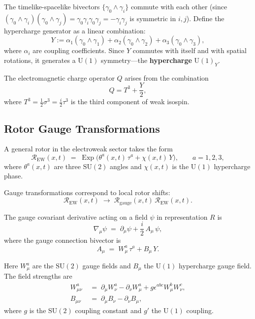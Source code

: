 \documentclass[11pt,a4paper]{article}
\newcommand{\Exp}{\operatorname{Exp}}
\newcommand{\Rotor}{\mathcal{R}}
\newcommand{\D}{\nabla}                        %
\newcommand{\SU}{\mathrm{SU}}
\newcommand{\U}{\mathrm{U}}
\theoremstyle{definition}
\theoremstyle{plain}
\theoremstyle{remark}
\begin{document}
The timelike-spacelike bivectors $\{\gamma_0\wedge\gamma_i\}$ commute with each other (since $(\gamma_0\wedge\gamma_i)(\gamma_0\wedge\gamma_j) = \gamma_0\gamma_i\gamma_0\gamma_j = -\gamma_i\gamma_j$ is symmetric in $i,j$). Define the hypercharge generator as a linear combination:
\begin{equation}
  Y := \alpha_1(\gamma_0\wedge\gamma_1) + \alpha_2(\gamma_0\wedge\gamma_2) + \alpha_3(\gamma_0\wedge\gamma_3),
  \label{eq:hypercharge}
\end{equation}
where $\alpha_i$ are coupling coefficients. Since $Y$ commutes with itself and with spatial rotations, it generates a $\U(1)$ symmetry---the \textbf{hypercharge} $\U(1)_Y$.

The electromagnetic charge operator $Q$ arises from the combination
\begin{equation}
  Q = T^3 + \frac{Y}{2},
\end{equation}
where $T^3 = \frac{1}{2}\sigma^3 = \frac{i}{2}\tau^3$ is the third component of weak isospin.

\subsection{Rotor Gauge Transformations}

A general rotor in the electroweak sector takes the form
\begin{equation}
  \Rotor_{\text{EW}}(x,t) \;=\; \Exp\!\big(\theta^a(x,t)\,\tau^a + \chi(x,t)\,Y\big),
  \qquad a=1,2,3,
  \label{eq:rotor-ew}
\end{equation}
where $\theta^a(x,t)$ are three $\SU(2)$ angles and $\chi(x,t)$ is the $\U(1)$ hypercharge phase.

Gauge transformations correspond to local rotor shifts:
\begin{equation}
  \Rotor_{\text{EW}}(x,t) \;\to\; \Rotor_{\text{gauge}}(x,t)\, \Rotor_{\text{EW}}(x,t).
\end{equation}

The gauge covariant derivative acting on a field $\psi$ in representation $R$ is
\begin{equation}
  \D_\mu \psi \;=\; \partial_\mu \psi + \frac{i}{2}\,A_\mu\,\psi,
\end{equation}
where the gauge connection bivector is
\begin{equation}
  A_\mu \;=\; W_\mu^a\,\tau^a + B_\mu\,Y.
  \label{eq:gauge-connection}
\end{equation}

Here $W_\mu^a$ are the $\SU(2)$ gauge fields and $B_\mu$ the $\U(1)$ hypercharge gauge field. The field strengths are
\begin{align}
  W_{\mu\nu}^a &\;=\; \partial_\mu W_\nu^a - \partial_\nu W_\mu^a + g\epsilon^{abc}W_\mu^b W_\nu^c, \label{eq:su2-field-strength} \\
  B_{\mu\nu} &\;=\; \partial_\mu B_\nu - \partial_\nu B_\mu, \label{eq:u1-field-strength}
\end{align}
where $g$ is the $\SU(2)$ coupling constant and $g'$ the $\U(1)$ coupling.
\end{document}
